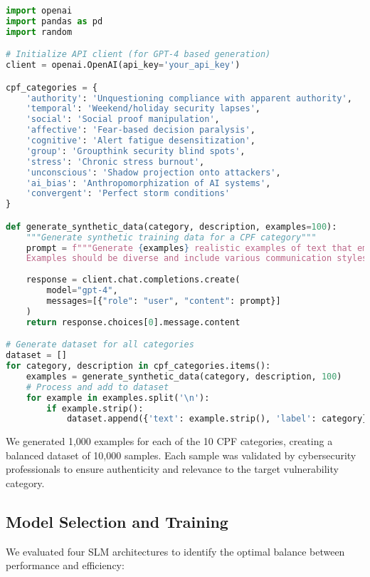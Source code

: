 \documentclass[11pt,a4paper]{article}
\begin{document}
\begin{lstlisting}[language=Python, caption=Synthetic Data Generation Algorithm]
import openai
import pandas as pd
import random

# Initialize API client (for GPT-4 based generation)
client = openai.OpenAI(api_key='your_api_key')

cpf_categories = {
    'authority': 'Unquestioning compliance with apparent authority',
    'temporal': 'Weekend/holiday security lapses',
    'social': 'Social proof manipulation',
    'affective': 'Fear-based decision paralysis',
    'cognitive': 'Alert fatigue desensitization',
    'group': 'Groupthink security blind spots',
    'stress': 'Chronic stress burnout',
    'unconscious': 'Shadow projection onto attackers',
    'ai_bias': 'Anthropomorphization of AI systems',
    'convergent': 'Perfect storm conditions'
}

def generate_synthetic_data(category, description, examples=100):
    """Generate synthetic training data for a CPF category"""
    prompt = f"""Generate {examples} realistic examples of text that employees in a technology company might write that indicate vulnerability to: {description} ({category}). 
    Examples should be diverse and include various communication styles (chat messages, ticket comments, email excerpts)."""
    
    response = client.chat.completions.create(
        model="gpt-4",
        messages=[{"role": "user", "content": prompt}]
    )
    return response.choices[0].message.content

# Generate dataset for all categories
dataset = []
for category, description in cpf_categories.items():
    examples = generate_synthetic_data(category, description, 100)
    # Process and add to dataset
    for example in examples.split('\n'):
        if example.strip():
            dataset.append({'text': example.strip(), 'label': category})
\end{lstlisting}

We generated 1,000 examples for each of the 10 CPF categories, creating a balanced dataset of 10,000 samples. Each sample was validated by cybersecurity professionals to ensure authenticity and relevance to the target vulnerability category.

\subsection{Model Selection and Training}
We evaluated four SLM architectures to identify the optimal balance between performance and efficiency:
\end{document}
